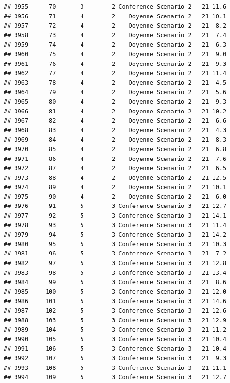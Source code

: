\documentclass[
]{article}
\begin{document}
\begin{verbatim}
## 3955      70       3        2 Conference Scenario 2   21 11.6
## 3956      71       4        2    Doyenne Scenario 2   21 10.1
## 3957      72       4        2    Doyenne Scenario 2   21  8.2
## 3958      73       4        2    Doyenne Scenario 2   21  7.4
## 3959      74       4        2    Doyenne Scenario 2   21  6.3
## 3960      75       4        2    Doyenne Scenario 2   21  9.0
## 3961      76       4        2    Doyenne Scenario 2   21  9.3
## 3962      77       4        2    Doyenne Scenario 2   21 11.4
## 3963      78       4        2    Doyenne Scenario 2   21  4.5
## 3964      79       4        2    Doyenne Scenario 2   21  5.6
## 3965      80       4        2    Doyenne Scenario 2   21  9.3
## 3966      81       4        2    Doyenne Scenario 2   21 10.2
## 3967      82       4        2    Doyenne Scenario 2   21  6.6
## 3968      83       4        2    Doyenne Scenario 2   21  4.3
## 3969      84       4        2    Doyenne Scenario 2   21  8.3
## 3970      85       4        2    Doyenne Scenario 2   21  6.8
## 3971      86       4        2    Doyenne Scenario 2   21  7.6
## 3972      87       4        2    Doyenne Scenario 2   21  6.5
## 3973      88       4        2    Doyenne Scenario 2   21 12.5
## 3974      89       4        2    Doyenne Scenario 2   21 10.1
## 3975      90       4        2    Doyenne Scenario 2   21  6.0
## 3976      91       5        3 Conference Scenario 3   21 12.7
## 3977      92       5        3 Conference Scenario 3   21 14.1
## 3978      93       5        3 Conference Scenario 3   21 11.4
## 3979      94       5        3 Conference Scenario 3   21 14.2
## 3980      95       5        3 Conference Scenario 3   21 10.3
## 3981      96       5        3 Conference Scenario 3   21  7.2
## 3982      97       5        3 Conference Scenario 3   21 12.8
## 3983      98       5        3 Conference Scenario 3   21 13.4
## 3984      99       5        3 Conference Scenario 3   21  8.6
## 3985     100       5        3 Conference Scenario 3   21 12.0
## 3986     101       5        3 Conference Scenario 3   21 14.6
## 3987     102       5        3 Conference Scenario 3   21 12.6
## 3988     103       5        3 Conference Scenario 3   21 12.9
## 3989     104       5        3 Conference Scenario 3   21 11.2
## 3990     105       5        3 Conference Scenario 3   21 10.4
## 3991     106       5        3 Conference Scenario 3   21 10.4
## 3992     107       5        3 Conference Scenario 3   21  9.3
## 3993     108       5        3 Conference Scenario 3   21 11.1
## 3994     109       5        3 Conference Scenario 3   21 12.7

\end{verbatim}
\end{document}
